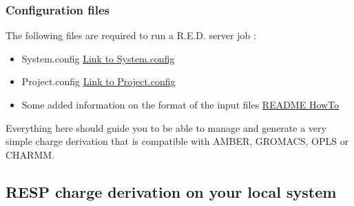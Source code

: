 \documentclass[a4paper]{article}
\begin{document}
\subsubsection{Configuration files}
The following files are required to run a R.E.D. server job :
\begin{itemize}
    \item System.config \href{https://upjv.q4md-forcefieldtools.org/REDServer-Development/Documentation/System.config}{Link to System.config}
    \item Project.config \href{https://upjv.q4md-forcefieldtools.org/REDServer-Development/Documentation/Project.config}{Link to Project.config}
    \item Some added information on the format of the input files \href{https://upjv.q4md-forcefieldtools.org/REDServer-Development/Documentation/readme.txt}{README HowTo}
\end{itemize}
\vspace{3mm}
\noindent Everything here should guide you to be able to manage and generate a very simple charge derivation that is compatible with AMBER, GROMACS, OPLS or CHARMM.\\
\pagebreak
%
%
%
%
%
%
%
%
%
%
%
%
%
%
%
%
%
%
%
%
%
%
%
%
%
%
%
%
%
%
\subsection{RESP charge derivation on your local system}\label{sec:resplocal}
\end{document}
